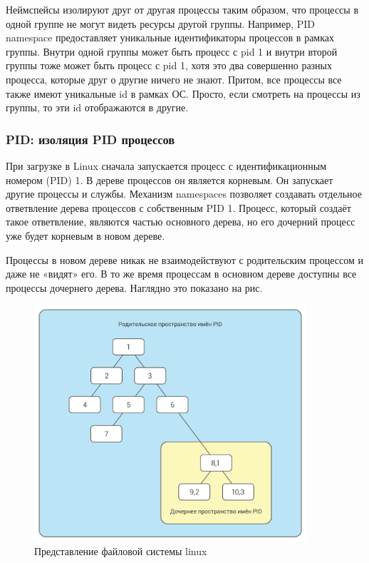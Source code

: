 Неймспейсы изолируют друг от другая процессы таким образом, что процессы в одной группе не могут видеть ресурсы другой группы. Например, PID namespace предоставляет уникальные идентификаторы процессов в рамках группы. Внутри одной группы может быть процесс с pid 1 и внутри второй группы тоже может быть процесс с pid 1, хотя это два совершенно разных процесса, которые друг о другие ничего не знают. Притом, все процессы все также имеют уникальные id в рамках ОС. Просто, если смотреть на процессы из группы, то эти id отображаются в другие.

\subsubsection{PID: изоляция PID процессов}

При загрузке в Linux сначала запускается процесс с идентификационным номером (PID) 1. В дереве процессов он является корневым. Он запускает другие процессы и службы. Механизм namespaces позволяет создавать отдельное ответвление дерева процессов с собственным PID 1. Процесс, который создаёт такое ответвление, являются частью основного дерева, но его дочерний процесс уже будет корневым в новом дереве.

Процессы в новом дереве никак не взаимодействуют с родительским процессом и даже не «видят» его. В то же время процессам в основном дереве доступны все процессы дочернего дерева. Наглядно это показано на рис.

\begin{figure}[h!]
\centering
\includegraphics[width=0.9\textwidth]{pid}
\caption{Представление файловой системы linux}
\label{fig4}
\end{figure}

